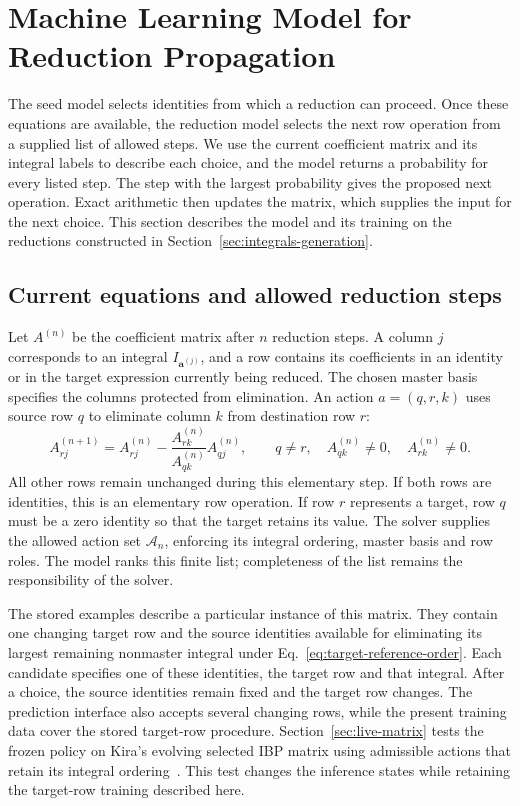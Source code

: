 \section{Machine Learning Model for Reduction Propagation}
\label{sec:reduction-model}
The seed model selects identities from which a reduction can proceed.
Once these equations are available, the reduction model selects the next
row operation from a supplied list of allowed steps. We use the current
coefficient matrix and its integral labels to describe each choice, and
the model returns a probability for every listed step. The step with the
largest probability gives the proposed next operation. Exact arithmetic
then updates the matrix, which supplies the input for the next choice.
This section describes the model and its training on the reductions
constructed in Section~\ref{sec:integrals-generation}.

\subsection{Current equations and allowed reduction steps}
Let $A^{(n)}$ be the coefficient matrix after $n$ reduction steps. A column
$j$ corresponds to an integral $I_{\boldsymbol a^{(j)}}$, and a row contains
its coefficients in an identity or in the target expression currently
being reduced. The chosen master basis specifies the columns protected
from elimination. An action $a=(q,r,k)$ uses source row $q$ to eliminate
column $k$ from destination row $r$:
\begin{equation}
 A^{(n+1)}_{rj}
 =A^{(n)}_{rj}
  -\frac{A^{(n)}_{rk}}{A^{(n)}_{qk}}A^{(n)}_{qj},
 \qquad q\ne r,\quad A^{(n)}_{qk}\ne0,\quad A^{(n)}_{rk}\ne0.
 \label{eq:reduction-action}
\end{equation}
All other rows remain unchanged during this elementary step. If both
rows are identities, this is an elementary row operation. If row $r$
represents a target, row $q$ must be a zero identity so that the target
retains its value. The solver supplies the allowed action set
$\mathcal A_n$, enforcing its integral ordering, master basis and row
roles. The model ranks this finite list; completeness of the list remains
the responsibility of the solver.

The stored examples describe a particular instance of this matrix.
They contain one changing target row and the source identities available
for eliminating its largest remaining nonmaster integral under
Eq.~\eqref{eq:target-reference-order}. Each candidate specifies one of
these identities, the target row and that integral. After a choice, the
source identities remain fixed and the target row changes. The prediction
interface also accepts several changing rows, while the present training
data cover the stored target-row procedure. Section~\ref{sec:live-matrix} tests the frozen policy on Kira's evolving
selected IBP matrix using admissible actions that retain its integral
ordering~\cite{Kira3}. This test changes the inference states while retaining
the target-row training described here.

